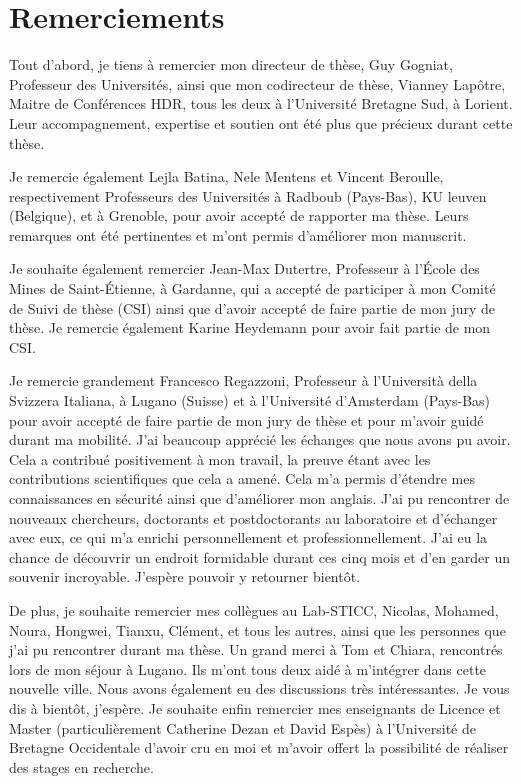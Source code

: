 \chapter*{Remerciements}

Tout d'abord, je tiens à remercier mon directeur de thèse, Guy Gogniat, Professeur des Universités, ainsi que mon codirecteur de thèse, Vianney Lapôtre, Maitre de Conférences HDR, tous les deux à l'Université Bretagne Sud, à Lorient. Leur accompagnement, expertise et soutien ont été plus que précieux durant cette thèse.

Je remercie également Lejla Batina, Nele Mentens et Vincent Beroulle, respectivement Professeurs des Universités à Radboub (Pays-Bas), KU leuven (Belgique), et à Grenoble, pour avoir accepté de rapporter ma thèse. Leurs remarques ont été pertinentes et m'ont permis d'améliorer mon manuscrit.

Je souhaite également remercier Jean-Max Dutertre, Professeur à l'\'Ecole des Mines de Saint-\'Etienne, à Gardanne, qui a accepté de participer à mon Comité de Suivi de thèse (CSI) ainsi que d'avoir accepté de faire partie de mon jury de thèse. Je remercie également Karine Heydemann pour avoir fait partie de mon CSI.

Je remercie grandement Francesco Regazzoni, Professeur à l'Università della Svizzera Italiana, à Lugano (Suisse) et à l'Université d'Amsterdam (Pays-Bas) pour avoir accepté de faire partie de mon jury de thèse et pour m'avoir guidé durant ma mobilité. J'ai beaucoup apprécié les échanges que nous avons pu avoir. Cela a contribué positivement à mon travail, la preuve étant avec les contributions scientifiques que cela a amené. Cela m'a permis d'étendre mes connaissances en sécurité ainsi que d'améliorer mon anglais. J'ai pu rencontrer de nouveaux chercheurs, doctorants et postdoctorants au laboratoire et d'échanger avec eux, ce qui m'a enrichi personnellement et professionnellement. J'ai eu la chance de découvrir un endroit formidable durant ces cinq mois et d'en garder un souvenir incroyable. J'espère pouvoir y retourner bientôt.

De plus, je souhaite remercier mes collègues au Lab-STICC, Nicolas, Mohamed, Noura, Hongwei, Tianxu, Clément, et tous les autres, ainsi que les personnes que j'ai pu rencontrer durant ma thèse. Un grand merci à Tom et Chiara, rencontrés lors de mon séjour à Lugano. Ils m'ont tous deux aidé à m'intégrer dans cette nouvelle ville. Nous avons également eu des discussions très intéressantes. Je vous dis à bientôt, j'espère. Je souhaite enfin remercier mes enseignants de Licence et Master (particulièrement Catherine Dezan et David Espès) à l'Université de Bretagne Occidentale d'avoir cru en moi et m'avoir offert la possibilité de réaliser des stages en recherche.

